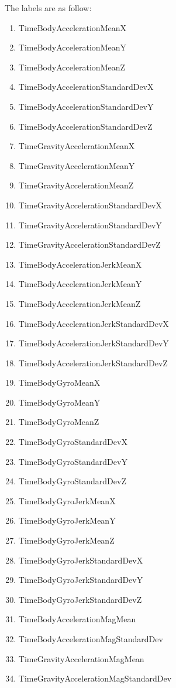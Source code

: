 \documentclass{article}
\begin{document}
The labels are as follow:
\begin{enumerate}
	\item TimeBodyAccelerationMeanX
	\item	TimeBodyAccelerationMeanY
	\item	TimeBodyAccelerationMeanZ
	\item	TimeBodyAccelerationStandardDevX
	\item	TimeBodyAccelerationStandardDevY
	\item	TimeBodyAccelerationStandardDevZ
	\item	TimeGravityAccelerationMeanX
	\item	TimeGravityAccelerationMeanY
	\item	TimeGravityAccelerationMeanZ
	\item	TimeGravityAccelerationStandardDevX
	\item	TimeGravityAccelerationStandardDevY
	\item	TimeGravityAccelerationStandardDevZ
	\item	TimeBodyAccelerationJerkMeanX
	\item	TimeBodyAccelerationJerkMeanY
	\item	TimeBodyAccelerationJerkMeanZ
	\item	TimeBodyAccelerationJerkStandardDevX
	\item	TimeBodyAccelerationJerkStandardDevY
	\item	TimeBodyAccelerationJerkStandardDevZ
	\item	TimeBodyGyroMeanX
	\item	TimeBodyGyroMeanY
	\item	TimeBodyGyroMeanZ
	\item	TimeBodyGyroStandardDevX
	\item	TimeBodyGyroStandardDevY
	\item	TimeBodyGyroStandardDevZ
	\item	TimeBodyGyroJerkMeanX
	\item	TimeBodyGyroJerkMeanY
	\item	TimeBodyGyroJerkMeanZ
	\item	TimeBodyGyroJerkStandardDevX
	\item	TimeBodyGyroJerkStandardDevY
	\item	TimeBodyGyroJerkStandardDevZ
	\item	TimeBodyAccelerationMagMean
	\item	TimeBodyAccelerationMagStandardDev
	\item	TimeGravityAccelerationMagMean
	\item	TimeGravityAccelerationMagStandardDev

\end{enumerate}
\end{document}
